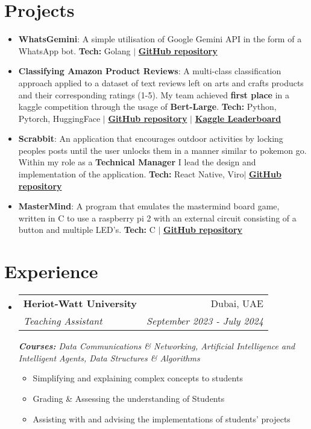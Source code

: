 \documentclass[a4paper,30pt]{article}
\makeatletter
\newcommand{\resumeItem}[2] {
	\item\small{
		\textbf{#1}{: #2 \vspace{-2pt}}
	}
}
\newcommand{\resumeItemWithoutTitle}[1] {
	\item\small{
		{#1 \vspace{-2pt}}
	}
}
\newcommand{\resumeSubheading}[4] {
	\vspace{-1pt}\item
	\begin{tabular*}{0.97\textwidth}{l@{\extracolsep{\fill}}r}
		\textbf{#1} & #2 \\
		\textit{#3} & \textit{#4} \\
	\end{tabular*}\vspace{-5pt}
}
\newcommand{\resumeSubItem}[2]{\resumeItem{#1}{#2}\vspace{-3pt}}
\newcommand{\resumeSubHeadingListStart}{\begin{itemize}[leftmargin=*]}
\newcommand{\resumeSubHeadingListEnd}{\end{itemize}}
\newcommand{\resumeItemListStart}{\begin{itemize}}
\newcommand{\resumeItemListEnd}{\end{itemize}\vspace{-5pt}}
\makeatother
\begin{document}
\section{Projects}
	\resumeSubHeadingListStart
        \resumeSubItem{WhatsGemini}{A simple utilisation of Google Gemini API in the form of a WhatsApp bot. \textbf{Tech:} Golang $\vert$ \href{https://github.com/asa30/WhatsGemini}{\textbf{GitHub repository}}}
        \resumeSubItem{Classifying Amazon Product Reviews}{A multi-class classification approach applied to a dataset of text reviews left on arts and crafts products and their corresponding ratings (1-5). My team achieved \textbf{first place} in a kaggle competition through the usage of \textbf{Bert-Large}.
        \textbf{Tech:} Python, Pytorch, HuggingFace
        $\vert$
        \href{https://github.com/fgs2/kaggle-comp-2024}{\textbf{GitHub repository}}
        $\vert$
        \href{https://www.kaggle.com/competitions/f20f21-aa-2023-2024-cw2/leaderboard}{\textbf{Kaggle Leaderboard}}
        }
		\resumeSubItem{Scrabbit}{ An application that encourages outdoor activities by locking peoples posts until the user unlocks them in a manner similar to pokemon go. Within my role as a \textbf{Technical Manager} I lead the design and implementation of the application.  \textbf{Tech:} React Native, Viro$\vert$ \href{https://github.com/Aucta-Studio/Scrabbit-expo}{\textbf{GitHub repository}}}
		\vspace{2pt}
		\resumeSubItem{MasterMind}{ A program that emulates the mastermind board game, written in C to use a raspberry pi 2 with an external circuit consisting of a button and multiple LED's. \textbf{Tech:} C $\vert$ \href{https://github.com/asa30/MasterMind}{\textbf{GitHub repository}}}
		\vspace{2pt}
	\resumeSubHeadingListEnd
	\vspace{-5pt}

\section{Experience}
	\resumeSubHeadingListStart
		\resumeSubheading{Heriot-Watt University}{Dubai, UAE}{Teaching Assistant}{September 2023 - July 2024}
		{\scriptsize \textit{ \footnotesize{\newline{}\textbf{Courses:} Data Communications \& Networking, Artificial Intelligence and Intelligent Agents, Data Structures \& Algorithms}}}
        \resumeItemListStart
            \resumeItemWithoutTitle{Simplifying and explaining complex concepts to students}
		\resumeItemWithoutTitle{Grading \& Assessing the understanding of Students}
            \resumeItemWithoutTitle{Assisting with and advising the implementations of students' projects}
		\resumeItemListEnd
	\resumeSubHeadingListEnd
\end{document}
